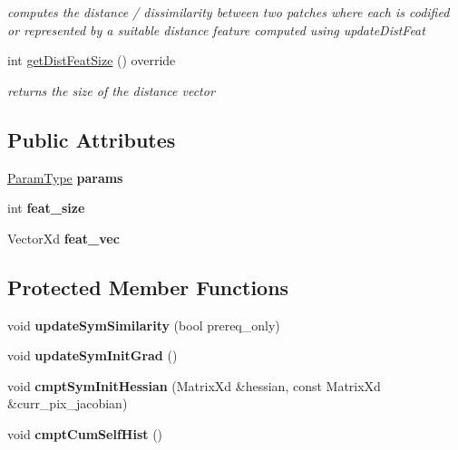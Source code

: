\begin{DoxyCompactItemize}
\begin{DoxyCompactList}\small\item\em computes the distance / dissimilarity between two patches where each is codified or represented by a suitable distance feature computed using update\-Dist\-Feat \end{DoxyCompactList}\item 
\hypertarget{classCCRE_a5ead9c9e9298c6f666b0134b3baa2225}{int \hyperlink{classCCRE_a5ead9c9e9298c6f666b0134b3baa2225}{get\-Dist\-Feat\-Size} () override}\label{classCCRE_a5ead9c9e9298c6f666b0134b3baa2225}

\begin{DoxyCompactList}\small\item\em returns the size of the distance vector \end{DoxyCompactList}\end{DoxyCompactItemize}
\subsection*{Public Attributes}
\begin{DoxyCompactItemize}
\item 
\hypertarget{classCCRE_a7e74137f7fd5f83e5cb831813157102a}{\hyperlink{structCCREParams}{Param\-Type} {\bfseries params}}\label{classCCRE_a7e74137f7fd5f83e5cb831813157102a}

\item 
\hypertarget{classCCRE_a0d172170d85e26d8eda32b889b0af245}{int {\bfseries feat\-\_\-size}}\label{classCCRE_a0d172170d85e26d8eda32b889b0af245}

\item 
\hypertarget{classCCRE_af97657776d1263aa1ba31aed2c0c86ed}{Vector\-Xd {\bfseries feat\-\_\-vec}}\label{classCCRE_af97657776d1263aa1ba31aed2c0c86ed}

\end{DoxyCompactItemize}
\subsection*{Protected Member Functions}
\begin{DoxyCompactItemize}
\item 
\hypertarget{classCCRE_a3601a5e879139e69558e9d88291f4645}{void {\bfseries update\-Sym\-Similarity} (bool prereq\-\_\-only)}\label{classCCRE_a3601a5e879139e69558e9d88291f4645}

\item 
\hypertarget{classCCRE_a6652e68a3221c69bd2bc830cdd32182f}{void {\bfseries update\-Sym\-Init\-Grad} ()}\label{classCCRE_a6652e68a3221c69bd2bc830cdd32182f}

\item 
\hypertarget{classCCRE_acdb7a48305fe90c59a1cfa32c7e31fc6}{void {\bfseries cmpt\-Sym\-Init\-Hessian} (Matrix\-Xd \&hessian, const Matrix\-Xd \&curr\-\_\-pix\-\_\-jacobian)}\label{classCCRE_acdb7a48305fe90c59a1cfa32c7e31fc6}

\item 
\hypertarget{classCCRE_a5ba97f2ce7f3f571c76f042de7557562}{void {\bfseries cmpt\-Cum\-Self\-Hist} ()}\label{classCCRE_a5ba97f2ce7f3f571c76f042de7557562}

\end{DoxyCompactItemize}

